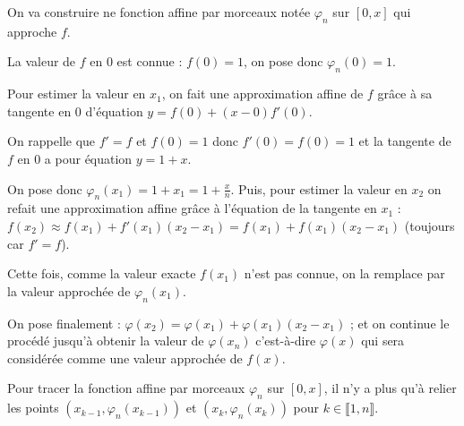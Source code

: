 \documentclass[a4paper,french,bookmarks]{article}
\begin{document}
On va construire ne fonction affine par morceaux notée $\varphi_n$ sur $\left[0,x\right]$ qui approche $f$.\vspace{1mm}


La valeur de $f$ en $0$ est connue : $f(0) = 1$, on pose donc $\varphi_n(0) = 1$.

Pour estimer la valeur en $x_1$, on fait une approximation affine de $f$ grâce à sa tangente en $0$ d'équation $y = f(0) + (x - 0)f'(0)$.

On rappelle que $f' = f$ et $f(0) = 1$ donc $f'(0) = f(0) = 1$ et la tangente de $f$ en $0$ a pour équation $y = 1 + x$.

On pose donc $\varphi_n(x_1) = 1 + x_1 = 1 + \frac{x}{n}$. Puis, pour estimer la valeur en $x_2$ on refait une approximation affine grâce à l'équation de la tangente en $x_1$ : $f(x_2) \approx f(x_1)+f'(x_1)(x_2-x_1) = f(x_1) + f(x_1)(x_2-x_1)$ (toujours car $f' = f$).

Cette fois, comme la valeur exacte $f(x_1)$ n'est pas connue, on la remplace par la valeur approchée de $\varphi_n(x_1)$.

On pose finalement : $\varphi(x_2) = \varphi(x_1) + \varphi(x_1)(x_2-x_1)$ ; et on continue le procédé jusqu'à obtenir la valeur de $\varphi(x_n)$ c'est-à-dire $\varphi(x)$ qui sera considérée comme une valeur approchée de $f(x)$.\vspace{2mm}

Pour tracer la fonction affine par morceaux $\varphi_n$ sur $\left[0, x\right]$, il n'y a plus qu'à relier les points $\left(x_{k-1}, \varphi_n(x_{k-1})\right)$ et $\left(x_k, \varphi_n(x_k)\right)$ pour $k \in \llbracket1,n\rrbracket$.
\end{document}
